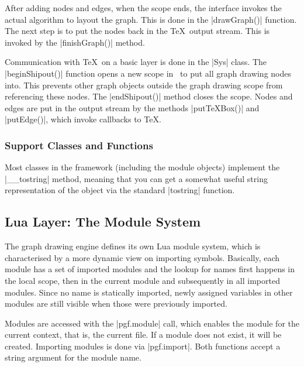 After adding nodes and edges, when the scope ends, the interface
invokes the actual algorithm to layout the graph. This is done in the
|drawGraph()| function. The next step is to put the nodes back in the
\TeX\ output stream. This is invoked by the |finishGraph()| method. 



Communication with \TeX\ on a basic layer is done in the |Sys|
class. The |beginShipout()| function opens a new scope in \pgfname\
to put all graph drawing nodes into. This prevents other graph objects
outside the graph drawing scope from referencing these nodes. The
|endShipout()| method closes the scope. Nodes and edges are put in the
output stream by the methods |putTeXBox()| and |putEdge()|, which
invoke callbacks to \TeX. 


\subsubsection{Support Classes and Functions}

Most classes in the framework (including the module objects) implement
the |__tostring| method, meaning that you can get a somewhat useful
string representation of the object via the standard |tostring|
function.








\subsection{Lua Layer: The Module System}
  
The graph drawing engine defines its own Lua module system, which is
characterised by a more dynamic view on importing symbols.  Basically,
each module has a set of imported modules and the lookup for names
first happens in the local scope, then in the current module and
subsequently in all imported modules.  Since no name is statically
imported, newly assigned variables in other modules are still visible
when those were previously imported.

Modules are accessed with the |pgf.module| call, which enables the
module for the current context, that is, the current file. If a module
does not exist, it will be created.  Importing modules is done via
|pgf.import|.  Both functions accept a string argument for the
module name.

